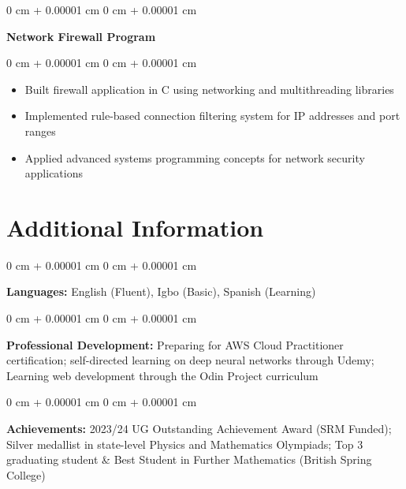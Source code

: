 \documentclass[10pt, a4paper]{article}
\newenvironment{highlights}{
    \begin{itemize}[
        topsep=0.10 cm,
        parsep=0.10 cm,
        partopsep=0pt,
        itemsep=0pt,
        leftmargin=20pt
    ]
}{
    \end{itemize}
} %
\newenvironment{onecolentry}{
    \begin{adjustwidth}{
        0 cm + 0.00001 cm
    }{
        0 cm + 0.00001 cm
    }
}{
    \end{adjustwidth}
} %
\begin{document}
    \vspace{0.2 cm}

    \begin{onecolentry}
        \textbf{Network Firewall Program}
    \end{onecolentry}

    \vspace{0.10 cm}
    \begin{onecolentry}
        \begin{highlights}
            \item Built firewall application in C using networking and multithreading libraries
            \item Implemented rule-based connection filtering system for IP addresses and port ranges
            \item Applied advanced systems programming concepts for network security applications
        \end{highlights}
    \end{onecolentry}

    \section{Additional Information}

    \begin{onecolentry}
        \textbf{Languages:} English (Fluent), Igbo (Basic), Spanish (Learning)
    \end{onecolentry}

    \vspace{0.2 cm}

    \begin{onecolentry}
        \textbf{Professional Development:} Preparing for AWS Cloud Practitioner certification; self-directed learning on deep neural networks through Udemy; Learning web development through the Odin Project curriculum
    \end{onecolentry}

    \vspace{0.2 cm}

    \begin{onecolentry}
        \textbf{Achievements:} 2023/24 UG Outstanding Achievement Award (SRM Funded); Silver medallist in state-level Physics and Mathematics Olympiads; Top 3 graduating student \& Best Student in Further Mathematics (British Spring College)
    \end{onecolentry}

    \vspace{0.2 cm}

\end{document}
